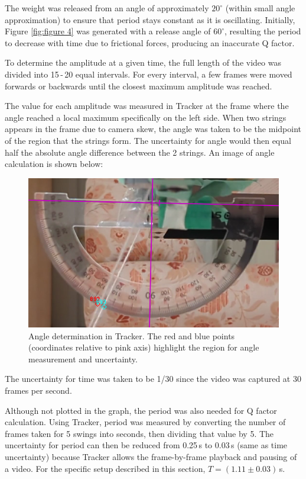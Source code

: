 \documentclass[11pt]{article}
\begin{document}
\begin{multicols}{2}
The weight was released from an angle of approximately $20^\circ$ (within small angle approximation) to ensure that period stays constant as it is oscillating.  Initially, Figure \ref{fig:figure 4} was generated with a release angle of $60^\circ$, resulting the period to decrease with time due to frictional forces, producing an inaccurate Q factor.

To determine the amplitude at a given time, the full length of the video was divided into 15\,-\,20 equal intervals. For every interval, a few frames were moved forwards or backwards until the closest maximum amplitude was reached.

The value for each amplitude was measured in Tracker \cite{tracker} at the frame where the angle reached a local maximum specifically on the left side. When two strings appears in the frame due to camera skew, the angle was taken to be the midpoint of the region that the strings form. The uncertainty for angle would then equal half the absolute angle difference between the 2 strings. An image of angle calculation is shown below:

\begin{figure}[H]
    \centering
    \includegraphics[width=\linewidth]{../figures/tracker.png}
    \caption{\centering Angle determination in Tracker. The red and blue points (coordinates relative to pink axis) highlight the region for angle measurement and uncertainty.}
    \label{fig:figure5}
\end{figure}

The uncertainty for time was taken to be 1/30 since the video was captured at 30 frames per second.

Although not plotted in the graph, the period was also needed for Q factor calculation. Using Tracker, period was measured by converting the number of frames taken for 5 swings into seconds, then dividing that value by 5. The uncertainty for period can then be reduced from 0.25\,s to 0.03\,s (same as time uncertainty) because Tracker allows the frame-by-frame playback and pausing of a video. For the specific setup described in this section, $T = (1.11 \pm 0.03)$\,s.


\end{multicols}
\end{document}
